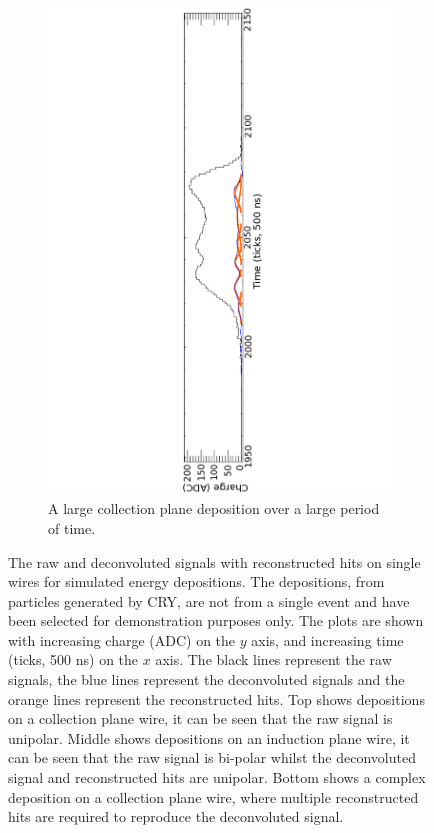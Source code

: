 \begin{figure}[h!]
\begin{subfigure}{0.95\textwidth}
    \includegraphics[width=\textwidth]{Complex}
    \caption{A large collection plane deposition over a large period of time.}
    \label{fig:LotsOfHits_Big}
  \end{subfigure}
  \caption[Reconstructed hits from simulated energy depositions]
          {The raw and deconvoluted signals with reconstructed hits on single wires for simulated energy depositions. The depositions, from particles generated by CRY, are not from a single event and have been selected for demonstration purposes only. The plots are shown with increasing charge (ADC) on the $y$ axis, and increasing time (ticks, 500 ns) on the $x$ axis. The black lines represent the raw signals, the blue lines represent the deconvoluted signals and the orange lines represent the reconstructed hits. Top shows depositions on a collection plane wire, it can be seen that the raw signal is unipolar. Middle shows depositions on an induction plane wire, it can be seen that the raw signal is bi-polar whilst the deconvoluted signal and reconstructed hits are unipolar. Bottom shows a complex deposition on a collection plane wire, where multiple reconstructed hits are required to reproduce the deconvoluted signal.}
  \label{fig:LotsOfHits}
\end{figure}

